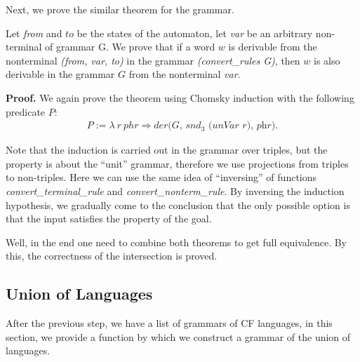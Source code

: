 Next, we prove the similar theorem for the grammar.

\begin{theorem}
	Let \textit{from} and $to$ be the states of the automaton, let \textit{var} be an arbitrary non-terminal of grammar G. We prove that if a word $w$ is derivable from the nonterminal \textit{(from, var, to)} in the grammar \textit{(convert\_rules G)}, then $w$ is also derivable in the grammar $G$ from the nonterminal \textit{var}.
\end{theorem}

\textbf{Proof.} 
We again prove the theorem using Chomsky induction with the following predicate $P$:
\begin{align*}
P :=  \lambda \ r \ phr \Rightarrow \textit{der(G, $snd_3$ (unVar r), phr)}.
\end{align*}

Note that the induction is carried out in the grammar over triples, but the property is about the ``unit'' grammar, therefore we use projections from triples to non-triples.
Here we can use the same idea of ``inversing'' of functions \textit{convert\_terminal\_rule} and \textit{convert\_nonterm\_rule}.
By inversing the induction hypothesis, we gradually come to the conclusion that the only possible option is that the input satisfies the property of the goal. 

 


Well, in the end one need to combine both theorems to get full equivalence. By this, the correctness of the intersection is proved.

\subsection{Union of Languages}

After the previous step, we have a list of grammars of CF languages, in this section, we provide a function by which we construct a grammar of the union of languages.

